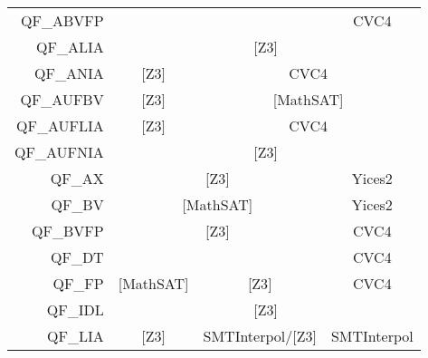 \begin{table}
{\begin{tabular}{|rccc|}
    QF\_ABVFP                        &                                    &                                           & \multicolumn{1}{|c|}{CVC4}        \\ \cline{2-4} 
    \multicolumn{1}{|r|}{QF\_ALIA}   & \multicolumn{3}{c|}{{[}Z3{]}}                                                                                     \\ \cline{2-4} 
    \multicolumn{1}{|r|}{QF\_ANIA}   & \multicolumn{1}{c|}{{[}Z3{]}}      & \multicolumn{2}{c|}{CVC4}                                                    \\ \cline{2-4} 
    \multicolumn{1}{|r|}{QF\_AUFBV}  & \multicolumn{1}{c|}{{[}Z3{]}}      & \multicolumn{2}{c|}{{[}MathSAT{]}}                                           \\ \cline{2-4} 
    \multicolumn{1}{|r|}{QF\_AUFLIA} & \multicolumn{1}{c|}{{[}Z3{]}}      & \multicolumn{2}{c|}{CVC4}                                                    \\ \cline{2-4} 
    \multicolumn{1}{|r|}{QF\_AUFNIA} & \multicolumn{3}{c|}{{[}Z3{]}}                                                                                     \\ \cline{2-4} 
    \multicolumn{1}{|r|}{QF\_AX}     & \multicolumn{2}{c|}{{[}Z3{]}}                                                  & \multicolumn{1}{c|}{Yices2}      \\ \cline{2-4} 
    \multicolumn{1}{|r|}{QF\_BV}     & \multicolumn{2}{c|}{{[}MathSAT{]}}                                             & \multicolumn{1}{c|}{Yices2}      \\ \cline{2-4} 
    \multicolumn{1}{|r|}{QF\_BVFP}   & \multicolumn{2}{c|}{{[}Z3{]}}                                                  & \multicolumn{1}{c|}{CVC4}        \\ \cline{2-4} 
    QF\_DT                           &                                    &                                           & \multicolumn{1}{|c|}{CVC4}       \\ \cline{2-4} 
    \multicolumn{1}{|r|}{QF\_FP}     & \multicolumn{1}{c|}{{[}MathSAT{]}} & \multicolumn{1}{c|}{{[}Z3{]}}             & \multicolumn{1}{c|}{CVC4}        \\ \cline{2-4} 
    \multicolumn{1}{|r|}{QF\_IDL}    & \multicolumn{3}{c|}{{[}Z3{]}}                                                                                     \\ \cline{2-4} 
    \multicolumn{1}{|r|}{QF\_LIA}    & \multicolumn{1}{c|}{{[}Z3{]}}      & \multicolumn{1}{c|}{SMTInterpol/{[}Z3{]}} & \multicolumn{1}{c|}{SMTInterpol} \\ \cline{2-4} 

\end{tabular}}
\end{table}
